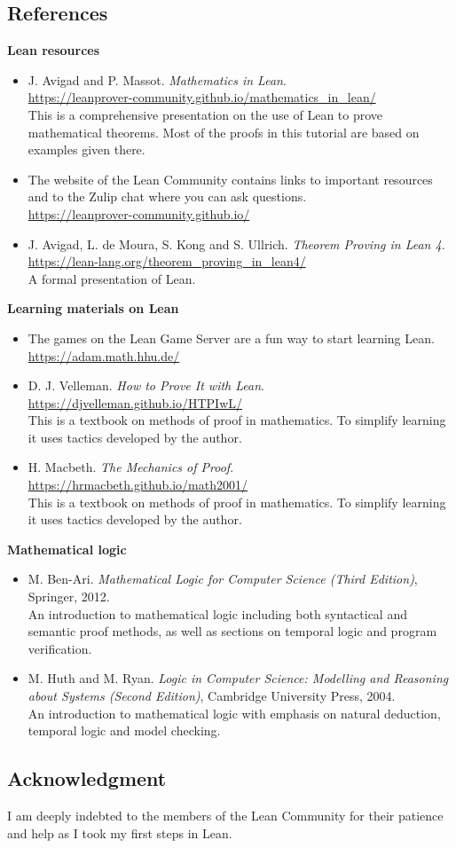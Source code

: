 \subsection*{References}
\textbf{Lean resources}
\begin{itemize}
\item J. Avigad and P. Massot. \textit{Mathematics in Lean}.\\
\indnt\url{https://leanprover-community.github.io/mathematics_in_lean/}\\
This is a comprehensive presentation on the use of Lean to prove mathematical theorems. Most of the proofs in this tutorial are based on examples given there.
\item The website of the Lean Community contains links to important resources and to the Zulip chat where you can ask questions.\\
\indnt{}\url{https://leanprover-community.github.io/}
\item J. Avigad, L. de Moura, S. Kong and S. Ullrich. 
\textit{Theorem Proving in Lean 4}. \\
\indnt{}\url{https://lean-lang.org/theorem_proving_in_lean4/}\\
A formal presentation of Lean.
\end{itemize}
\textbf{Learning materials on Lean}
\begin{itemize}
\item The games on the Lean Game Server are a fun way to start learning Lean.\\
\indnt{}\url{https://adam.math.hhu.de/}
\item D. J. Velleman. \textit{How to Prove It with Lean}.\\
\indnt{}\url{https://djvelleman.github.io/HTPIwL/}\\
This is a textbook on methods of proof in mathematics. To simplify learning it uses tactics developed by the author.
\item H. Macbeth. \textit{The Mechanics of Proof}.\\
\indnt{}\url{https://hrmacbeth.github.io/math2001/}\\
This is a textbook on methods of proof in mathematics. To simplify learning it uses tactics developed by the author.
\end{itemize}
\textbf{Mathematical logic}
\begin{itemize}
\item M. Ben-Ari. \textit{Mathematical Logic for Computer Science (Third Edition)}, Springer, 2012.\\
An introduction to mathematical logic including both syntactical and semantic proof methods, as well as sections on temporal logic and program verification.
\item M. Huth and M. Ryan. \textit{Logic in Computer Science: Modelling and Reasoning about Systems (Second Edition)}, Cambridge University Press, 2004.\\
An introduction to mathematical logic with emphasis on natural deduction, temporal logic and model checking.
\end{itemize}

\subsection*{Acknowledgment}

I am deeply indebted to the members of the Lean Community for their patience and help as I took my first steps in Lean.


